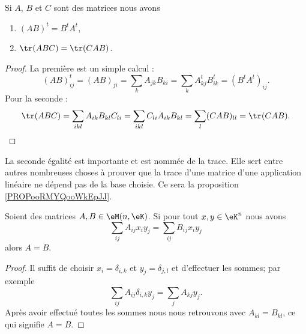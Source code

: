 \begin{lemma}        \label{LEMooUXDRooWZbMVN}
	Si \( A\), \( B\) et \( C\) sont des matrices nous avons
	\begin{enumerate}
		\item
		      \( (AB)^t=B^tA^t\),
		\item       \label{ITEMooXDYQooAlnArd}
		      \( \tr(ABC)=\tr(CAB)\).
	\end{enumerate}
\end{lemma}

\begin{proof}
	La première est un simple calcul :
	\begin{equation}
		(AB)^t_{ij}=(AB)_{ji}=\sum_kA_{jk}B_{ki}=\sum_kA^t_{kj}B^t_{ik}=(B^tA^t)_{ij}.
	\end{equation}
	Pour la seconde :
	\begin{equation}
		\tr(ABC)=\sum_{ikl}A_{ik}B_{kl}C_{li}=\sum_{ikl}C_{li}A_{ik}B_{kl}=\sum_l(CAB)_{ll}=\tr(CAB).
	\end{equation}
\end{proof}

\begin{normaltext}
	La seconde égalité est importante et est nommée  de la trace. Elle sert entre autres nombreuses choses à prouver que la trace d'une matrice d'une application linéaire ne dépend pas de la base choisie. Ce sera la proposition \ref{PROPooRMYQooWkEpJJ}.
\end{normaltext}

\begin{lemma}       \label{LEMooLXAHooPRyHaF}
	Soient des matrices \( A,B\in \eM(n,\eK)\). Si pour tout \( x,y\in \eK^n\) nous avons
	\begin{equation}
		\sum_{ij}A_{ij}x_iy_j=\sum_{ij}B_{ij}x_iy_j
	\end{equation}
	alors \( A=B\).
\end{lemma}

\begin{proof}
	Il suffit de choisir \( x_i=\delta_{i,k}\) et \( y_j=\delta_{j,l}\) et d'effectuer les sommes; par exemple
	\begin{equation}
		\sum_{ij}A_{ij}\delta_{i,k}y_j=\sum_jA_{kj}y_j.
	\end{equation}
	Après avoir effectué toutes les sommes nous nous retrouvons avec \( A_{kl}=B_{kl}\), ce qui signifie \( A=B\).
\end{proof}


